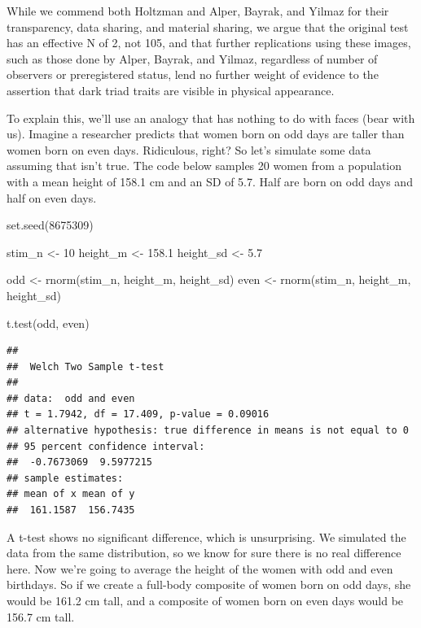 \documentclass[
  doc,floatsintext]{apa6}
\newenvironment{Shaded}{\begin{snugshade}}{\end{snugshade}}
\newcommand{\DecValTok}[1]{\textcolor[rgb]{0.00,0.00,0.81}{#1}}
\newcommand{\FloatTok}[1]{\textcolor[rgb]{0.00,0.00,0.81}{#1}}
\newcommand{\FunctionTok}[1]{\textcolor[rgb]{0.00,0.00,0.00}{#1}}
\newcommand{\NormalTok}[1]{#1}
\newcommand{\OtherTok}[1]{\textcolor[rgb]{0.56,0.35,0.01}{#1}}
\begin{document}
While we commend both Holtzman and Alper, Bayrak, and Yilmaz for their transparency, data sharing, and material sharing, we argue that the original test has an effective N of 2, not 105, and that further replications using these images, such as those done by Alper, Bayrak, and Yilmaz, regardless of number of observers or preregistered status, lend no further weight of evidence to the assertion that dark triad traits are visible in physical appearance.

To explain this, we'll use an analogy that has nothing to do with faces (bear with us). Imagine a researcher predicts that women born on odd days are taller than women born on even days. Ridiculous, right? So let's simulate some data assuming that isn't true. The code below samples 20 women from a population with a mean height of 158.1 cm and an SD of 5.7. Half are born on odd days and half on even days.

\begin{Shaded}
\begin{Highlighting}[]
\FunctionTok{set.seed}\NormalTok{(}\DecValTok{8675309}\NormalTok{)}

\NormalTok{stim\_n }\OtherTok{\textless{}{-}} \DecValTok{10}
\NormalTok{height\_m }\OtherTok{\textless{}{-}} \FloatTok{158.1}
\NormalTok{height\_sd }\OtherTok{\textless{}{-}} \FloatTok{5.7}

\NormalTok{odd }\OtherTok{\textless{}{-}} \FunctionTok{rnorm}\NormalTok{(stim\_n, height\_m, height\_sd)}
\NormalTok{even }\OtherTok{\textless{}{-}} \FunctionTok{rnorm}\NormalTok{(stim\_n, height\_m, height\_sd)}

\FunctionTok{t.test}\NormalTok{(odd, even)}
\end{Highlighting}
\end{Shaded}

\begin{verbatim}
## 
##  Welch Two Sample t-test
## 
## data:  odd and even
## t = 1.7942, df = 17.409, p-value = 0.09016
## alternative hypothesis: true difference in means is not equal to 0
## 95 percent confidence interval:
##  -0.7673069  9.5977215
## sample estimates:
## mean of x mean of y 
##  161.1587  156.7435
\end{verbatim}

A t-test shows no significant difference, which is unsurprising. We simulated the data from the same distribution, so we know for sure there is no real difference here. Now we're going to average the height of the women with odd and even birthdays. So if we create a full-body composite of women born on odd days, she would be 161.2 cm tall, and a composite of women born on even days would be 156.7 cm tall.
\end{document}
